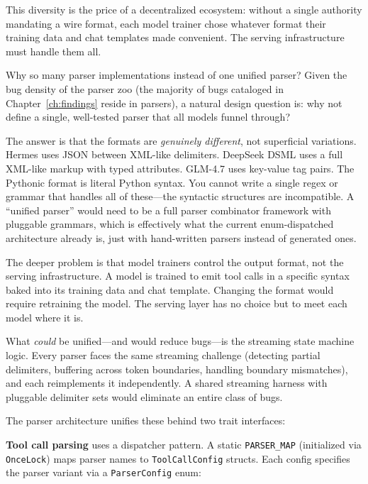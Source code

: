 This diversity is the price of a decentralized ecosystem: without a single authority mandating a wire format, each model trainer chose whatever format their training data and chat templates made convenient. The serving infrastructure must handle them all.

\begin{whynotbox}{Why so many parser implementations instead of one unified parser?}
Given the bug density of the parser zoo (the majority of bugs cataloged in Chapter~\ref{ch:findings} reside in parsers), a natural design question is: why not define a single, well-tested parser that all models funnel through?

The answer is that the formats are \emph{genuinely different}, not superficial variations. Hermes uses JSON between XML-like delimiters. DeepSeek DSML uses a full XML-like markup with typed attributes. GLM-4.7 uses key-value tag pairs. The Pythonic format is literal Python syntax. You cannot write a single regex or grammar that handles all of these---the syntactic structures are incompatible. A ``unified parser'' would need to be a full parser combinator framework with pluggable grammars, which is effectively what the current enum-dispatched architecture already is, just with hand-written parsers instead of generated ones.

The deeper problem is that model trainers control the output format, not the serving infrastructure. A model is trained to emit tool calls in a specific syntax baked into its training data and chat template. Changing the format would require retraining the model. The serving layer has no choice but to meet each model where it is.

What \emph{could} be unified---and would reduce bugs---is the streaming state machine logic. Every parser faces the same streaming challenge (detecting partial delimiters, buffering across token boundaries, handling boundary mismatches), and each reimplements it independently. A shared streaming harness with pluggable delimiter sets would eliminate an entire class of bugs.
\end{whynotbox}

The parser architecture unifies these behind two trait interfaces:

\textbf{Tool call parsing} uses a dispatcher pattern. A static \texttt{PARSER\_MAP} (initialized via \texttt{OnceLock}) maps parser names to \texttt{ToolCallConfig} structs. Each config specifies the parser variant via a \texttt{ParserConfig} enum:

